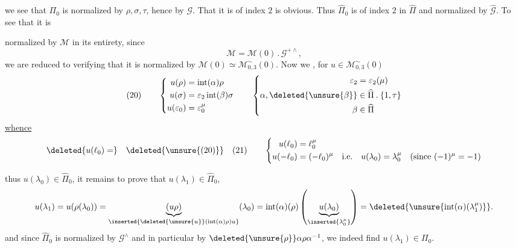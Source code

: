 we see that $\Pi_0$ is  normalized by $\rho,\sigma,\tau$, hence by $\mathcal G$. That it is of index $2$ is obvious. Thus $\widehat\Pi_0$ is of index $2$ in $\widehat\Pi$ and normalized by $\widehat{\mathcal G}$. To see that it is



normalized by $\mathcal M$ in its  entirety, since
\[
\mathcal M=\mathcal M(0)\mathbin{.}\mathcal G^{+\wedge},
\]
we are reduced to verifying that it is normalized by
$\mathcal M(0)\simeq\mathcal M_{0,3}^{\sim}(0)$.
Now we , for $u\in\mathcal M_{0,3}^{\sim}(0)$
\[
(20)\qquad
\left\{
\begin{aligned}
u(\rho)&=\operatorname{int}(\alpha)\rho\\
u(\sigma)&=\varepsilon_2\operatorname{int}(\beta)\sigma\\
u(\varepsilon_0)&=\varepsilon_0^\mu
\end{aligned}
\right.
\qquad
\left\{
\begin{aligned}
\varepsilon_2&=\varepsilon_2(\mu)\\
\alpha,\deleted{\unsure{\beta}}&\in\widehat{\Pi}\mathbin{.}\{1,\tau\}\\
\beta&\in\widehat{\Pi}
\end{aligned}
\right.
\]
\uline{whence}
\[
\deleted{u(\ell_0)=}\quad
\deleted{\unsure{(20)}}\quad
(21)\qquad
\left\{
\begin{aligned}
u(\ell_0)&=\ell_0^\mu\\
u(-\ell_0)&=(-\ell_0)^\mu
\quad\text{i.e.}\quad
u(\lambda_0)=\lambda_0^\mu
\quad(\text{since }(-1)^\mu=-1)
\end{aligned}
\right.
\]
\margin{$\unsure{)}$}

thus $u(\lambda_0)\in\widehat{\Pi}_0$, it remains to prove that
$u(\lambda_1)\in\widehat{\Pi}_0$, 
\[
u(\lambda_1)
=u(\rho(\lambda_0))
=\underbrace{(u\rho)}_{\inserted{\deleted{\unsure{u}}(\operatorname{int}(\alpha)\rho)u}}(\lambda_0)
=\operatorname{int}(\alpha)(\rho)
\left(\underbrace{u(\lambda_0)}_{\inserted{\lambda_0^\mu}}\right)
=\deleted{\unsure{\operatorname{int}(\alpha)(\lambda_1^\mu)}}.
\]
and since $\widehat{\Pi}_0$ is normalized by $\mathcal G^\wedge$
and in particular by $\deleted{\unsure{\rho}}\alpha\rho\alpha^{-1}$,
we indeed find $u(\lambda_1)\in\Pi_0$.

